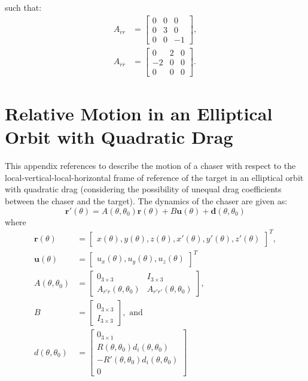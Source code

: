 such that:
\begin{subequations}
\begin{align}
    A_{\dot{r}r}&=\begin{bmatrix}
        0&0&0\\
        0&3&0\\
        0&0&-1
    \end{bmatrix},\\
    A_{\dot{r}\dot{r}}&=\begin{bmatrix}
        0&2&0\\
        -2&0&0\\
        0&0&0
    \end{bmatrix}.
\end{align}
\end{subequations}

\section{Relative Motion in an Elliptical Orbit with Quadratic Drag} \label{app:ellp-undrag}
This appendix references \cite{carter2002clohessy} to describe the motion of a chaser with respect to the local-vertical-local-horizontal frame of reference of the target in an elliptical orbit with quadratic drag (considering the possibility of unequal drag coefficients between the chaser and the target). The dynamics of the chaser are given as:
\begin{equation}
    \boldsymbol{r}'(\theta)=A(\theta,\theta_0)\boldsymbol{r}(\theta)+B\boldsymbol{u}(\theta)+\boldsymbol{d}(\theta, \theta_0)
\end{equation}
where
\begin{subequations}
\begin{align}
    \boldsymbol{r}(\theta)&=\begin{bmatrix}
    x(\theta),y(\theta),z(\theta),x'(\theta),y'(\theta),z'(\theta)
    \end{bmatrix}^T,\\
    \boldsymbol{u}(\theta)&=\begin{bmatrix}
    u_x(\theta),u_y(\theta),u_z(\theta)
    \end{bmatrix}^T\\
    A(\theta, \theta_0)&=\begin{bmatrix}
        0_{3\times3}&I_{3\times3}\\
        A_{r'r}(\theta, \theta_0)&A_{r'r'}(\theta, \theta_0)
    \end{bmatrix},\\
    B&=\begin{bmatrix}
        0_{3\times3}\\
        I_{3\times3}
    \end{bmatrix},\text{ and}\\
    d(\theta, \theta_0)&=\begin{bmatrix}
        0_{3\times1}\\
        R(\theta,\theta_0)d_i(\theta,\theta_0)\\
        -R'(\theta,\theta_0)d_i(\theta,\theta_0)\\
        0
    \end{bmatrix}
\end{align}
\end{subequations}
